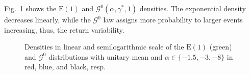 \documentclass{beamer}
\begin{document}
\begin{frame}
Fig.~\ref{Fig:GI0Distribution} shows the $\text{E}(1)$ and $\mathcal G^0(\alpha,\gamma^*, 1)$ densities.
The exponential density decreases linearly, while the $\mathcal G^0$ law assigns more probability to larger events increasing, thus, the return variability.

\begin{figure}[hbt]
\centering
{}
\caption[Densities in linear and semilogarithmic scale of the $\text{E}(1)$ (green) and $\mathcal G^0$ distributions]{Densities in linear and semilogarithmic scale of the $\text{E}(1)$ (green) and $\mathcal G^0$ distributions with unitary mean and $\alpha\in\{-1.5,-3,-8\}$ in red, blue, and black, resp.}\label{Fig:GI0Distribution}
\end{figure}
\end{frame}
\end{document}

